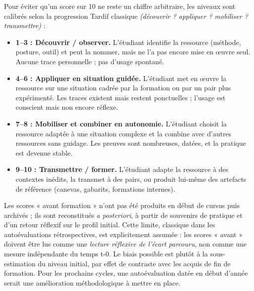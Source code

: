 \begin{tcolorbox}[colback=gray!5, colframe=gray!50!black, boxrule=0.4pt, arc=3pt,
  left=8pt, right=8pt, top=6pt, bottom=6pt,
  title={\textbf{\small Grille de descripteurs de niveau (clé de lecture des scores)}},
  fonttitle=\small\bfseries, coltitle=white, attach boxed title to top left={yshift=-2mm, xshift=4mm},
  boxed title style={colback=gray!50!black, arc=3pt, boxrule=0pt}]
\small
Pour éviter qu'un score sur 10 ne reste un chiffre arbitraire, les niveaux sont calibrés selon la progression Tardif classique \emph{(découvrir ? appliquer ? mobiliser ? transmettre)} :

\begin{itemize}
  \item \textbf{1--3 : Découvrir / observer.} L'étudiant identifie la ressource (méthode, posture, outil) et peut la nommer, mais ne l'a pas encore mise en œuvre seul. Aucune trace personnelle ; pas d'usage spontané.
  \item \textbf{4--6 : Appliquer en situation guidée.} L'étudiant met en œuvre la ressource sur une situation cadrée par la formation ou par un pair plus expérimenté. Les traces existent mais restent ponctuelles ; l'usage est conscient mais non encore réflexe.
  \item \textbf{7--8 : Mobiliser et combiner en autonomie.} L'étudiant choisit la ressource adaptée à une situation complexe et la combine avec d'autres ressources sans guidage. Les preuves sont nombreuses, datées, et la pratique est devenue stable.
  \item \textbf{9--10 : Transmettre / former.} L'étudiant adapte la ressource à des contextes inédits, la transmet à des pairs, ou produit lui-même des artefacts de référence (canevas, gabarits, formations internes).
\end{itemize}
\end{tcolorbox}

\begin{tcolorbox}[colback=yellow!8, colframe=orange!70!black, boxrule=0.4pt, arc=3pt,
  left=8pt, right=8pt, top=6pt, bottom=6pt,
  title={\textbf{\small Limite méthodologique : biais rétrospectif des scores « avant »}},
  fonttitle=\small\bfseries, coltitle=white, attach boxed title to top left={yshift=-2mm, xshift=4mm},
  boxed title style={colback=orange!70!black, arc=3pt, boxrule=0pt}]
\small
Les scores « avant formation » n'ont pas été produits en début de cursus puis archivés ; ils sont reconstitués \emph{a posteriori}, à partir de souvenirs de pratique et d'un retour réflexif sur le profil initial. Cette limite, classique dans les autoévaluations rétrospectives, est explicitement assumée : les scores « avant » doivent être lus comme une \emph{lecture réflexive de l'écart parcouru}, non comme une mesure indépendante du temps t-0. Le biais possible est plutôt à la sous-estimation du niveau initial, par effet de contraste avec les acquis de fin de formation. Pour les prochains cycles, une autoévaluation datée en début d'année serait une amélioration méthodologique à mettre en place.
\end{tcolorbox}

